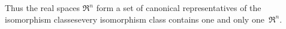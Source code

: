 \documentclass[10pt,t]{beamer}
\begin{document}
\begin{frame}
\co[co:FiniteDimensionalIsoToReN]

\pause
\medskip
Thus the real spaces $\Re^n$ form a set of canonical
representatives of the isomorphism classes\Dash every 
isomorphism class contains one and only one~$\Re^n$.
\end{frame}



% 
\end{document}
